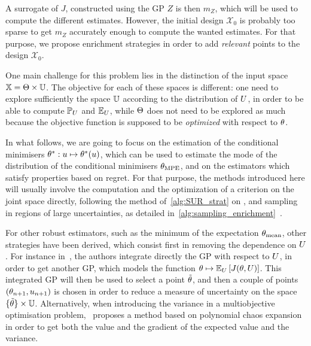 \documentclass[../../Main_ManuscritThese.tex]{subfiles}
\begin{document}
A surrogate of $J$, constructed using the GP $Z$ is then $m_Z$, which
will be used to compute the different estimates. However, the initial
design $\mathcal{X}_0$ is probably too sparse to get $m_Z$ accurately
enough to compute the wanted estimates. For that purpose, we propose
enrichment strategies in order to add \emph{relevant} points to the
design $\mathcal{X}_0$.

One main challenge for this problem lies in the distinction of the
input space $\mathbb{X} = \Theta \times \mathbb{U}$. The objective for each
of these spaces is different: one need to explore sufficiently the
space $\mathbb{U}$ according to the distribution of $U$, in order to be
able to compute $\mathbb{P}_{U}$ and $\mathbb{E}_{U}$, while $\Theta$ does
not need to be explored as much because the objective function is
supposed to be \emph{optimized} with respect to $\theta$.

In what follows, we are going to focus on the estimation of the
conditional minimisers $\theta^*: u\mapsto \theta^*(u)$, which can be
used to estimate the mode of the distribution of the conditional
minimisers ${\theta}_{\mathrm{MPE}}$, and on the estimators which satisfy
properties based on regret.  For that purpose, the methods introduced
here will usually involve the computation and the optimization of a
criterion on the joint space directly, following the method
of~\cref{alg:SUR_strat} on , and sampling in
regions of large uncertainties, as detailed
in~\cref{alg:sampling_enrichment}~.

For other robust estimators, such as the minimum of the expectation
${\theta}_{\mathrm{mean}}$, other strategies have been derived, which
consist first in removing the dependence on $U$. For instance
in~\cite{janusevskis_simultaneous_2010}, the authors integrate
directly the GP with respect to $U$, in order to get another GP,
which models the function
$\theta\mapsto \mathbb{E}_{U}\left[J(\theta, U)\right]$. This integrated GP
will then be used to select a point $\tilde{\theta}$, and then a couple
of points $(\theta_{n+1},u_{n+1})$ is chosen in order to reduce a
measure of uncertainty on the space $\{\tilde{\theta}\}\times \mathbb{U}$.
Alternatively, when introducing the variance in a multiobjective
optimisation problem,~\cite{miranda_adjoint-based_2016} proposes a
method based on polynomial chaos expansion in order to get both the
value and the gradient of the expected value and the variance.


\end{document}

